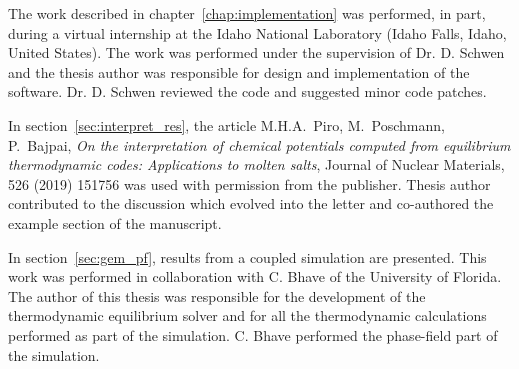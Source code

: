 The work described in chapter~\ref{chap:implementation} was performed, in part, during a virtual internship at the Idaho National Laboratory (Idaho Falls, Idaho, United States). The work was performed under the supervision of Dr. D. Schwen and the thesis author was responsible for design and implementation of the software. Dr. D. Schwen reviewed the code and suggested minor code patches.

In section~\ref{sec:interpret_res}, the article {M.H.A.\ Piro}, {M.\ Poschmann}, {P.\ Bajpai}, \textit{On the interpretation of chemical potentials computed from equilibrium thermodynamic codes: Applications to molten salts}, {Journal of Nuclear Materials, 526 (2019) 151756} was used with permission from the publisher. Thesis author contributed to the discussion which evolved into the letter and co-authored the example section of the manuscript.

In section~\ref{sec:gem_pf}, results from a coupled simulation are presented. This work was performed in collaboration with C. Bhave of the University of Florida. The author of this thesis was responsible for the development of the thermodynamic equilibrium solver and for all the thermodynamic calculations performed as part of the simulation. C. Bhave performed the phase-field part of the simulation.